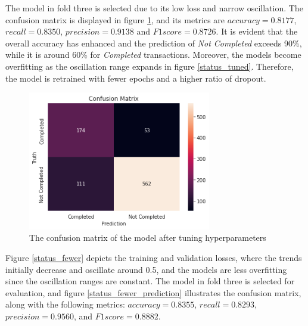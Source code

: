 \documentclass[12pt,twoside]{report}
\begin{document}
The model in fold three is selected due to its low loss and narrow oscillation. The confusion matrix is displayed in figure \ref{status_tuned_prediction}, and its metrics are $accuracy = 0.8177$, $recall = 0.8350$, $precision = 0.9138$ and $F1 score = 0.8726$. It is evident that the overall accuracy has enhanced and the prediction of \textit{Not Completed} exceeds 90\%, while it is around 60\% for \textit{Completed} transactions. Moreover, the models become overfitting as the oscillation range expands in figure \ref{status_tuned}. Therefore, the model is retrained with fewer epochs and a higher ratio of dropout. 
\\

\begin{figure}[!htbp]
	\centering
	\includegraphics[width=8cm]{cm_tuned}
	\caption{The confusion matrix of the model after tuning hyperparameters}
	\label{status_tuned_prediction}
\end{figure}

Figure \ref{status_fewer} depicts the training and validation losses, where the trends initially decrease and oscillate around 0.5, and the models are less overfitting since the oscillation ranges are constant. The model in fold three is selected for evaluation, and figure \ref{status_fewer_prediction} illustrates the confusion matrix, along with the following metrics: $accuracy = 0.8355$, $recall = 0.8293$, $precision = 0.9560$, and $F1 score = 0.8882$. 
\\
\end{document}
